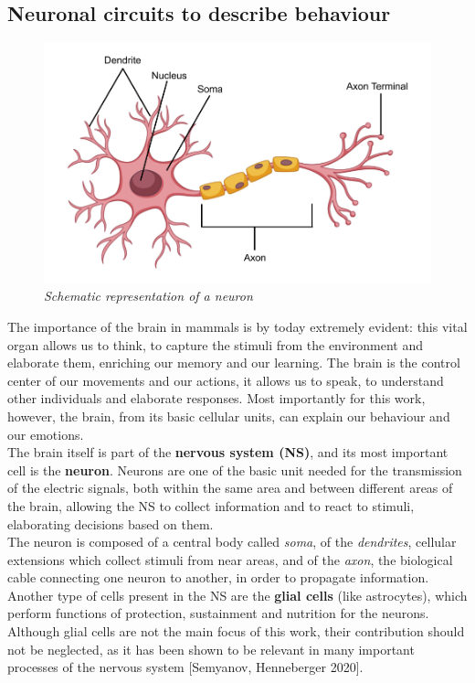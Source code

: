 \documentclass[a4paper]{article}
\begin{document}
	\subsection{Neuronal circuits to describe behaviour}
	
	\begin{figure}[H]
		\begin{center}
			\includegraphics[scale=.25]{neuron.png} 
		\end{center} 
		\caption{\textit{Schematic representation of a neuron}}
		
	\end{figure}
	
	The importance of the brain in mammals is by today extremely evident: this vital organ allows us to think,  to capture the stimuli from the environment and elaborate them, enriching our memory and  our learning. The brain is the control center of our movements and our actions, it allows us to speak, to understand other individuals and elaborate responses. Most importantly for this work, however, the brain, from its basic cellular units, can explain our behaviour and our emotions. \\

	
	The brain itself is part of the \textbf{nervous system (NS)}, and its most important cell is the \textbf{neuron}.	Neurons are one of the basic unit needed for the transmission of
	the electric signals, both within the same area and between different areas of
	the brain, allowing the NS to collect information and to react to stimuli,
	elaborating decisions based on them. \\
	The neuron is composed of a central body called \textit{soma}, of the \textit{dendrites}, cellular extensions which collect stimuli from near areas, and of the \textit{axon}, the biological cable connecting one neuron to another, in order to propagate information. 
	Another type of cells present in the NS are the \textbf{glial cells} (like astrocytes), which perform functions of protection, sustainment and nutrition for the neurons. Although glial cells are not the main focus of this work, their contribution should not be neglected, as it has been shown to be relevant in many important processes of the nervous system [Semyanov, Henneberger 2020]. \\
	
\end{document}
